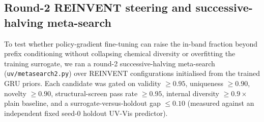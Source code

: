 \documentclass[11pt]{article}
\begin{document}
\subsection{Round-2 REINVENT steering and successive-halving meta-search}
\label{sec:round2}

To test whether policy-gradient fine-tuning can raise the in-band fraction beyond prefix
conditioning without collapsing chemical diversity or overfitting the training surrogate, we
ran a round-2 successive-halving meta-search (\texttt{uv/metasearch2.py}) over REINVENT
configurations initialised from the trained GRU priors. Each candidate was gated on
validity $\ge 0.95$, uniqueness $\ge 0.90$, novelty $\ge 0.90$, structural-screen pass rate
$\ge 0.95$, internal diversity $\ge 0.9\times$ plain baseline, and a surrogate-versus-holdout
gap $\le 0.10$ (measured against an independent fixed seed-0 holdout UV-Vis predictor).
\end{document}
